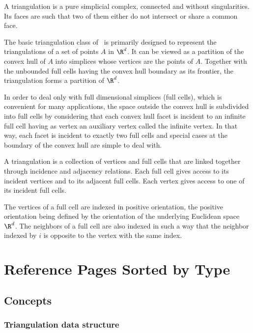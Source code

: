 


A triangulation is a pure simplicial complex, connected and without
singularities. Its faces are such that two of them either do not
intersect or share a common face.

The basic triangulation class of \cgal\ is primarily designed to
represent the triangulations of a set of points $A$ in $\R^d$.
 It can be
viewed as a partition of the convex hull of $A$ into simplices whose
vertices are the points of $A$. Together with the unbounded full cells having
the convex hull boundary as its frontier, the triangulation forms a
partition of $\R^d$.

In order to deal only with full dimensional simplices (full cells),
 which is convenient for many
applications, the space outside the convex hull is subdivided into
full cells by
considering that each convex hull facet is incident to an infinite
full cell having as vertex an auxiliary vertex called the infinite
vertex. In that way, each facet is incident to exactly two full cells and
special cases at the boundary of the convex hull are simple to deal
with. 

A triangulation is a collection of vertices and full cells that are linked
together through incidence and adjacency relations. Each full cell gives
access to its incident vertices and to its adjacent
full cells. Each vertex gives access to one of its incident full cells. 

The vertices of a full cell are indexed in positive
orientation, the positive orientation being defined by the orientation
of the underlying Euclidean space $\R^d$. The neighbors of a full cell are also
indexed  in such a way that the neighbor indexed by $i$
is opposite to the vertex with the same index.



\section{Reference Pages Sorted by Type}

\subsection{Concepts}

\subsubsection*{Triangulation data structure}

